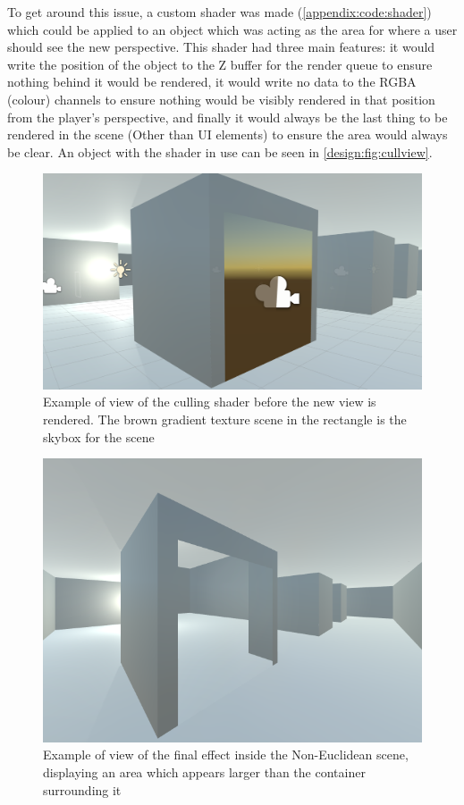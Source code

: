 		To get around this issue, a custom shader was made (\autoref{appendix:code:shader}) which could be applied to an object which was acting as the area for where a user should see the new perspective.
		This shader had three main features: it would write the position of the object to the Z buffer for the render queue to ensure nothing behind it would be rendered, it would write no data to the RGBA (colour) channels to ensure nothing would be visibly rendered in that position from the player's perspective, and finally it would always be the last thing to be rendered in the scene (Other than UI elements) to ensure the area would always be clear.
		An object with the shader in use can be seen in \autoref{design:fig:cullview}.

		\begin{figure}[h]
			\includegraphics[width=1\textwidth]{Images/NE_Scene_View}
			\centering
			\caption{Example of view of the culling shader before the new view is rendered. The brown gradient texture scene in the rectangle is the skybox for the scene}
			\label{design:fig:cullview}
		\end{figure}

		\begin{figure}[h]
			\includegraphics[width=1\textwidth]{Images/NE_View}
			\centering
			\caption{Example of view of the final effect inside the Non-Euclidean scene, displaying an area which appears larger than the container surrounding it}
			\label{design:fig:game}
		\end{figure}


